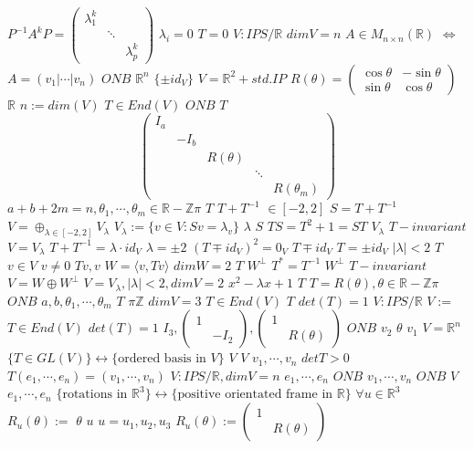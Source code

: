 \documentclass{article}
\begin{document}
$P^{-1}A^kP=\begin{pmatrix}\lambda_1^k&&\\&\ddots&\\&&\lambda_p^k\end{pmatrix}$
$\lambda_i=0$
$T=0$
$V:IPS/\mathbb{R}$
$dimV=n$
$A \in M_{n \times n}(\mathbb{R})$
$\Longleftrightarrow$
$A=(v_1| \cdots | v_n)$
$ONB$
$\mathbb{R}^n$
$\{\pm id_V\}$
$V=\mathbb{R}^2+std.IP$
$R(\theta)=\begin{pmatrix}\cos\theta&-\sin\theta\\\sin\theta&\cos\theta\end{pmatrix}$
$\mathbb{R}$
$n:=dim(V)$
$T \in End(V)$
$ONB$
$T$
$$
\begin{pmatrix}I_a&&&&\\
&-I_b&&&\\
&&R(\theta)&\\
&&&\ddots&\\
&&&&R(\theta_m)\end{pmatrix}
$$
$a+b+2m=n,\theta_1,\cdots,\theta_m \in \mathbb{R}-\mathbb{Z}\pi$
$T$
$T+T^{-1}$
$\in [-2,2]$
$S=T+T^{-1}$
$V= \oplus_{\lambda \in [-2,2]} V_\lambda$
$V_\lambda:=\{v \in V: Sv=\lambda_v\}$
$\lambda$
$S$
$TS=T^2+1=ST$
$V_\lambda$
$T-invariant$
$V=V_\lambda$
$T+T^{-1}=\lambda \cdot id_V$
$\lambda = \pm 2$
$(T \mp id_V)^2=0_V$
$T \mp id_V$
$T=\pm id_V$
$|\lambda|<2$
$T$
$v \in V$
$v \neq 0$
$Tv,v$
$W= \langle v,Tv \rangle$
$dimW=2$
$T$
$W^\perp$
$T^*=T^{-1}$
$W^\perp$
$T-invariant$
$V=W \oplus W^\perp$
$V=V_\lambda, |\lambda|<2, dimV=2$
$x^2-\lambda x+1$
$T$
$T=R(\theta),\theta \in \mathbb{R}-\mathbb{Z}\pi$
$ONB$
$a,b,\theta_1,\cdots, \theta_m$
$T$
$\pi\mathbb{Z}$
$dimV=3$
$T \in End(V)$
$T$
$det(T)=1$
$V:IPS/\mathbb{R}$
$V:=$
$T \in End(V)$
$det(T)=1$
$I_3,\begin{pmatrix}1&\\&-I_2\end{pmatrix},\begin{pmatrix}1&\\&R(\theta)\end{pmatrix}$
$ONB$
$v_2$
$\theta$
$v_1$
$V= \mathbb{R}^n$
$\{T \in GL(V)\} \leftrightarrow \{\text{ordered basis in } V\}$
$V$
$V$
$v_1, \cdots, v_n$
$detT>0$
$T(e_1, \cdots, e_n)=(v_1, \cdots,v_n)$
$V:IPS/\mathbb{R},dimV=n$
$e_1, \cdots, e_n$
$ONB$
$v_1, \cdots,v_n$
$ONB$
$V$
$e_1, \cdots, e_n$
$\{\text{rotations in } \mathbb{R}^3\} \leftrightarrow \{\text{positive orientated frame in } \mathbb{R}\}$
$\forall u \in \mathbb{R}^3$
$R_u(\theta):=$
$\theta$
$u$
$u=u_1,u_2,u_3$
$R_u(\theta):=\begin{pmatrix}1&\\&R(\theta)\end{pmatrix}$
\end{document}
